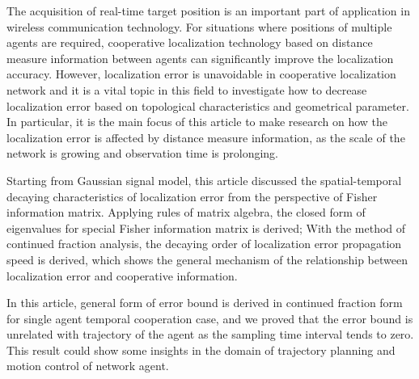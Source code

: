 
\begin{eabstract}
The acquisition of real-time target position is an important part of application in wireless communication technology. For situations where positions of multiple agents are required, cooperative localization technology based on distance measure information between agents can significantly improve the localization accuracy. However, localization error is unavoidable in cooperative localization network and it is a vital topic in this field to investigate how to decrease localization error based on topological characteristics and geometrical parameter. In particular, it is the main focus of this article to make research on how the localization error is affected by distance measure information, as the scale of the network is growing and observation time is prolonging.

Starting from Gaussian signal model, this article discussed the spatial-temporal decaying characteristics of localization error from the perspective of Fisher information matrix. Applying rules of matrix algebra, the closed form of eigenvalues for special Fisher information matrix is derived; With the method of continued fraction analysis, the decaying order of localization error propagation speed is derived, which shows the general mechanism of the relationship between localization error and cooperative information.

In this article, general form of error bound is derived in continued fraction form for single agent temporal cooperation case, and we proved that the error bound is unrelated with trajectory of the agent as the sampling time interval tends to zero. This result could show some insights in the domain of trajectory planning and motion control of network agent.

\end{eabstract}

